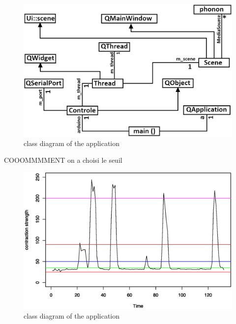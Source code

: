 \documentclass[conference]{IEEEtran}
\begin{document}
\begin{figure}[!hb]
    \includegraphics[scale=0.30]{Figures/app3.eps}
    \caption{class diagram of the application}
    \label{fig:diagram}
\end{figure}


COOOMMMMENT on a choisi le seuil
\begin{figure}[!hb]
    \includegraphics[scale=0.30]{Figures/contractions.eps}
    \caption{class diagram of the application}
    \label{fig:contractionsGraph}
\end{figure}
\end{document}
